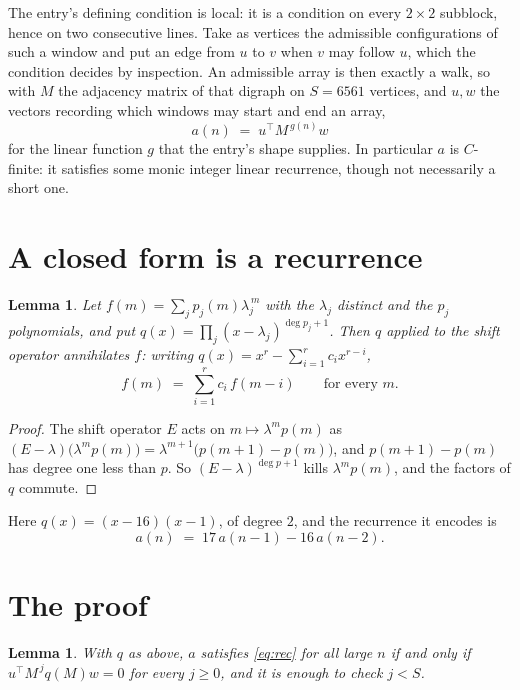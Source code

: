 \documentclass[11pt,a4paper]{article}
\theoremstyle{plain}
\newtheorem{lemma}[theorem]{Lemma}
\theoremstyle{definition}
\begin{document}
The entry's defining condition is local: it is a condition on every $2\times2$ subblock, hence on two consecutive lines. Take as vertices the
admissible configurations of such a window and put an edge from $u$ to $v$ when $v$ may
follow $u$, which the condition decides by inspection. An admissible array is then exactly a
walk, so with $M$ the adjacency matrix of that digraph on $S=6561$ vertices, and $u,w$ the
vectors recording which windows may start and end an array,
\[
a(n)\;=\;u^{\!\top}M^{\,g(n)}w
\]
for the linear function $g$ that the entry's shape supplies. In particular $a$ is
$C$-finite: it satisfies some monic integer linear recurrence, though not necessarily a short
one.

\section{A closed form is a recurrence}

\begin{lemma}\label{lem:ann}
Let $f(m)=\sum_{j}p_j(m)\lambda_j^{\,m}$ with the $\lambda_j$ distinct and the $p_j$
polynomials, and put $q(x)=\prod_j(x-\lambda_j)^{\deg p_j+1}$. Then $q$ applied to the shift
operator annihilates $f$: writing $q(x)=x^{r}-\sum_{i=1}^{r}c_ix^{r-i}$,
\[
f(m)\;=\;\sum_{i=1}^{r}c_i\,f(m-i)\qquad\text{for every }m.
\]
\end{lemma}

\begin{proof}
The shift operator $E$ acts on $m\mapsto\lambda^{m}p(m)$ as
$(E-\lambda)\bigl(\lambda^{m}p(m)\bigr)=\lambda^{m+1}\bigl(p(m+1)-p(m)\bigr)$, and
$p(m+1)-p(m)$ has degree one less than $p$. So $(E-\lambda)^{\deg p+1}$ kills
$\lambda^{m}p(m)$, and the factors of $q$ commute.
\end{proof}

Here $q(x)=(x-16)(x-1)$, of degree $2$, and the recurrence it encodes is
\begin{equation}\label{eq:rec}
a(n)\;=\;17\,a(n-1) - 16\,a(n-2).
\end{equation}

\section{The proof}

\begin{lemma}\label{lem:crit}
With $q$ as above, $a$ satisfies \eqref{eq:rec} for all large $n$ if and only if
$u^{\!\top}M^{\,j}q(M)w=0$ for every $j\ge0$, and it is enough to check $j<S$.
\end{lemma}
\end{document}
